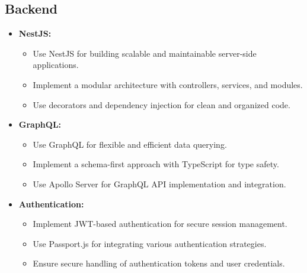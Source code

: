 \subsection{Backend}
\begin{itemize}[leftmargin=*]
    \item \textbf{NestJS:}
    \begin{itemize}
        \item Use NestJS for building scalable and maintainable server-side applications.
        \item Implement a modular architecture with controllers, services, and modules.
        \item Use decorators and dependency injection for clean and organized code.
    \end{itemize}
    
    \item \textbf{GraphQL:}
    \begin{itemize}
        \item Use GraphQL for flexible and efficient data querying.
        \item Implement a schema-first approach with TypeScript for type safety.
        \item Use Apollo Server for GraphQL API implementation and integration.
    \end{itemize}
    
    \item \textbf{Authentication:}
    \begin{itemize}
        \item Implement JWT-based authentication for secure session management.
        \item Use Passport.js for integrating various authentication strategies.
        \item Ensure secure handling of authentication tokens and user credentials.
    \end{itemize}
\end{itemize}

